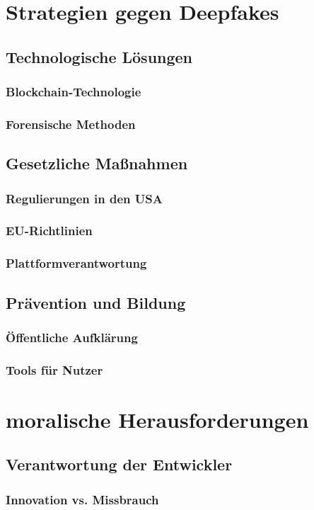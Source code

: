 \documentclass[a4paper,12pt]{article}
\begin{document}
\section{Strategien gegen Deepfakes}
\subsection{Technologische Lösungen}
\subsubsection{Blockchain-Technologie}
\subsubsection{Forensische Methoden}
\subsection{Gesetzliche Maßnahmen}
\subsubsection{Regulierungen in den USA}
\subsubsection{EU-Richtlinien}
\subsubsection{Plattformverantwortung}
\subsection{Prävention und Bildung}
\subsubsection{Öffentliche Aufklärung}
\subsubsection{Tools für Nutzer}
\newpage
\section{moralische Herausforderungen}
\subsection{Verantwortung der Entwickler}
\subsubsection{Innovation vs. Missbrauch}
\end{document}
